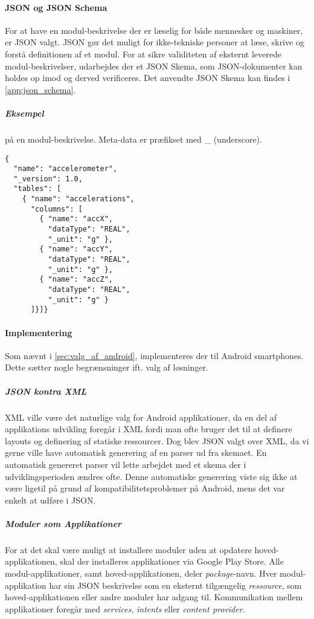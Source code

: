 \paragraph{JSON og JSON Schema}
For at have en modul-beskrivelse der er læselig for både mennesker og maskiner, er JSON valgt.
JSON gør det muligt for ikke-tekniske personer at læse, skrive og forstå definitionen af et modul.
For at sikre validiteten af eksternt leverede modul-beskrivelser, udarbejdes der et JSON Skema, som JSON-dokumenter kan holdes op imod og derved verificeres.
Det anvendte JSON Skema kan findes i \cref{app:json_schema}.

\subparagraph{Eksempel} på en modul-beskrivelse.
Meta-data er præfikset med \_ (underscore).
\begin{lstlisting}
{
  "name": "accelerometer",
  "_version": 1.0,
  "tables": [
    { "name": "accelerations",
      "columns": [
        { "name": "accX",
          "dataType": "REAL",
          "_unit": "g" },
        { "name": "accY",
          "dataType": "REAL",
          "_unit": "g" },
        { "name": "accZ",
          "dataType": "REAL",
          "_unit": "g" }
      ]}]}
\end{lstlisting}

\paragraph{Implementering}
Som nævnt i \cref{sec:valg_af_android}, implementeres der til Android smartphones.
Dette sætter nogle begrænsninger ift. valg af løsninger.

\subparagraph{JSON kontra XML}
XML ville være det naturlige valg for Android applikationer, da en del af applikations udvikling foregår i XML fordi man ofte bruger det til at definere layouts og definering af statiske ressourcer. 
Dog blev JSON valgt over XML, da vi gerne ville have automatisk generering af en parser ud fra skemaet.
En automatisk genereret parser vil lette arbejdet med et skema der i udviklingsperioden ændres ofte.
Denne automatiske generering viste sig ikke at være ligetil på grund af kompatibilitetsproblemer på Android, mens det var enkelt at udføre i JSON.

\subparagraph{Moduler som Applikationer}
For at det skal være muligt at installere moduler uden at opdatere hoved-applikationen, skal der installeres applikationer via Google Play Store.
Alle modul-applikationer, samt hoved-applikationen, deler \textit{package}-navn.
Hver modul-applikation har sin JSON beskrivelse som en eksternt tilgængelig \textit{ressource}, som hoved-applikationen eller andre moduler har adgang til.
Kommunikation mellem applikationer foregår med \textit{services}, \textit{intents} eller \textit{content provider}.

